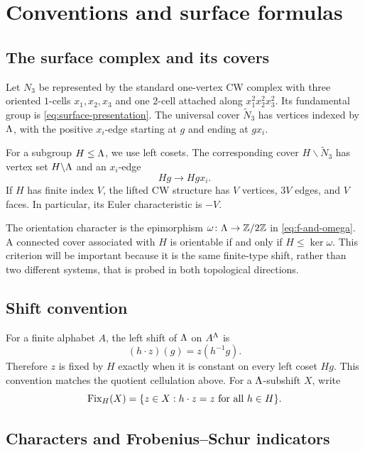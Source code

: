 \section{Conventions and surface formulas}
\label{sec:background}

\subsection{The surface complex and its covers}

Let $N_3$ be represented by the standard one-vertex CW complex with three
oriented $1$-cells $x_1,x_2,x_3$ and one $2$-cell attached along
$x_1^2x_2^2x_3^2$.  Its fundamental group is
\eqref{eq:surface-presentation}.  The universal cover $\widetilde N_3$ has
vertices indexed by $\Lambda$, with the positive $x_i$-edge starting at
$g$ and ending at $gx_i$.

For a subgroup $H\leq\Lambda$, we use left cosets.  The corresponding
cover $H\backslash\widetilde N_3$ has vertex set $H\backslash\Lambda$ and
an $x_i$-edge
\[
 Hg\longrightarrow Hgx_i.
\]
If $H$ has finite index $V$, the lifted CW structure has $V$ vertices, $3V$
edges, and $V$ faces.  In particular, its Euler characteristic is $-V$.

The orientation character is the epimorphism
$\omega\colon\Lambda\to\mathbb{Z}/2\mathbb{Z}$ in \eqref{eq:f-and-omega}.  A connected
cover associated with $H$ is orientable if and only if
$H\leq\ker\omega$.  This criterion will be important because it is the same
finite-type shift, rather than two different systems, that is probed in both
topological directions.

\subsection{Shift convention}

For a finite alphabet $A$, the left shift of $\Lambda$ on
$A^{\Lambda}$ is
\[
 (h\cdot z)(g)=z(h^{-1}g).
\]
Therefore $z$ is fixed by $H$ exactly when it is constant on every left coset
$Hg$.  This convention matches the quotient cellulation above.  For a
$\Lambda$-subshift $X$, write
\[
 \operatorname{Fix}_H(X)=\{z\in X:h\cdot z=z\text{ for all }h\in H\}.
\]

\subsection{Characters and Frobenius--Schur indicators}

